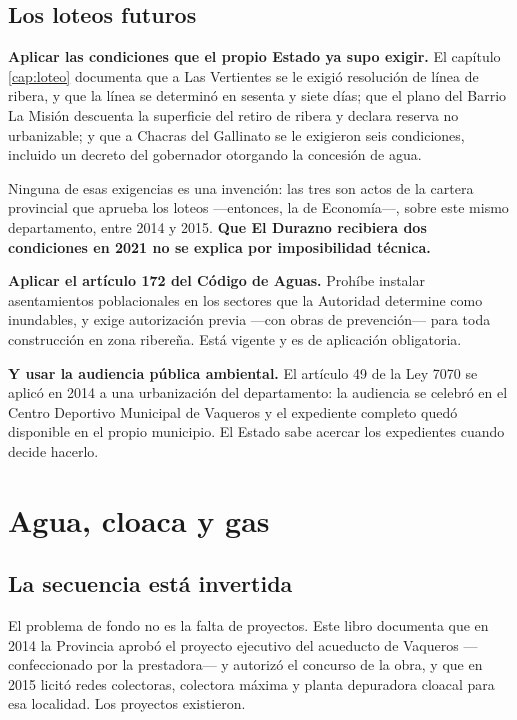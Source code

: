 \subsection*{Los loteos futuros}

\textbf{Aplicar las condiciones que el propio Estado ya supo exigir.} El capítulo \ref{cap:loteo} documenta
que a Las Vertientes se le exigió resolución de línea de ribera, y que la línea se determinó
en sesenta y siete días; que el plano del Barrio La Misión descuenta la superficie del retiro
de ribera y declara reserva no urbanizable; y que a Chacras del Gallinato se le exigieron seis
condiciones, incluido un decreto del gobernador otorgando la concesión de agua.

Ninguna de esas exigencias es una invención: las tres son actos de la cartera provincial que
aprueba los loteos ---entonces, la de Economía---, sobre este mismo departamento, entre 2014 y 2015. \textbf{Que El Durazno recibiera dos
condiciones en 2021 no se explica por imposibilidad técnica.}

\textbf{Aplicar el artículo 172 del Código de Aguas.} Prohíbe instalar asentamientos poblacionales en los sectores que la Autoridad determine como inundables, y exige autorización previa ---con obras de prevención--- para toda construcción en zona ribereña. Está vigente y es de aplicación
obligatoria.

\textbf{Y usar la audiencia pública ambiental.} El artículo 49 de la Ley 7070 se aplicó en
2014 a una urbanización del departamento: la audiencia se celebró en el Centro Deportivo
Municipal de Vaqueros y el expediente completo quedó disponible en el propio municipio. El
Estado sabe acercar los expedientes cuando decide hacerlo.

\section{Agua, cloaca y gas}

\subsection*{La secuencia está invertida}

El problema de fondo no es la falta de proyectos. Este libro documenta que en 2014 la
Provincia aprobó el proyecto ejecutivo del acueducto de Vaqueros ---confeccionado por la prestadora--- y autorizó el concurso de la obra, y que en 2015 licitó redes
colectoras, colectora máxima y planta depuradora cloacal para esa localidad. Los proyectos
existieron.

